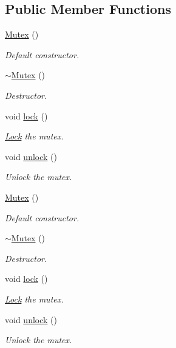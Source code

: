\subsection*{Public Member Functions}
\begin{DoxyCompactItemize}
\item 
\hyperlink{classsf_1_1_mutex_a9bd52a48320fd7b6db8a78037aad276e}{Mutex} ()
\begin{DoxyCompactList}\small\item\em Default constructor. \end{DoxyCompactList}\item 
\hyperlink{classsf_1_1_mutex_a9f76a67b7b6d3918131a692179b4e3f2}{$\sim$\-Mutex} ()
\begin{DoxyCompactList}\small\item\em Destructor. \end{DoxyCompactList}\item 
void \hyperlink{classsf_1_1_mutex_a1a16956a6bbea764480c1b80f2e45763}{lock} ()
\begin{DoxyCompactList}\small\item\em \hyperlink{classsf_1_1_lock}{Lock} the mutex. \end{DoxyCompactList}\item 
void \hyperlink{classsf_1_1_mutex_ade71268ffc5e80756652058b01c23c33}{unlock} ()
\begin{DoxyCompactList}\small\item\em Unlock the mutex. \end{DoxyCompactList}\item 
\hyperlink{classsf_1_1_mutex_a9bd52a48320fd7b6db8a78037aad276e}{Mutex} ()
\begin{DoxyCompactList}\small\item\em Default constructor. \end{DoxyCompactList}\item 
\hyperlink{classsf_1_1_mutex_a9f76a67b7b6d3918131a692179b4e3f2}{$\sim$\-Mutex} ()
\begin{DoxyCompactList}\small\item\em Destructor. \end{DoxyCompactList}\item 
void \hyperlink{classsf_1_1_mutex_a1a16956a6bbea764480c1b80f2e45763}{lock} ()
\begin{DoxyCompactList}\small\item\em \hyperlink{classsf_1_1_lock}{Lock} the mutex. \end{DoxyCompactList}\item 
void \hyperlink{classsf_1_1_mutex_ade71268ffc5e80756652058b01c23c33}{unlock} ()
\begin{DoxyCompactList}\small\item\em Unlock the mutex. \end{DoxyCompactList}\end{DoxyCompactItemize}


